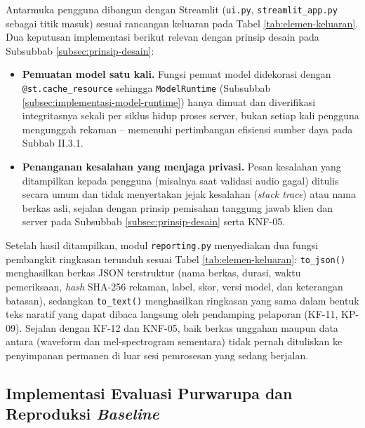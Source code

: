    

Antarmuka pengguna dibangun dengan Streamlit (\texttt{ui.py},
\texttt{streamlit\_app.py} sebagai titik masuk) sesuai rancangan keluaran pada
Tabel \ref{tab:elemen-keluaran}. Dua keputusan implementasi berikut relevan
dengan prinsip desain pada Subsubbab \ref{subsec:prinsip-desain}:

\begin{itemize}
  \item \textbf{Pemuatan model satu kali.} Fungsi pemuat model didekorasi dengan
  \texttt{@st.cache\_resource} sehingga \texttt{ModelRuntime} (Subsubbab
  \ref{subsec:implementasi-model-runtime}) hanya dimuat dan diverifikasi
  integritasnya sekali per siklus hidup proses server, bukan setiap kali
  pengguna mengunggah rekaman -- memenuhi pertimbangan efisiensi sumber daya
  pada Subbab II.3.1.
  \item \textbf{Penanganan kesalahan yang menjaga privasi.} Pesan kesalahan yang
  ditampilkan kepada pengguna (misalnya saat validasi audio gagal) ditulis
  secara umum dan tidak menyertakan jejak kesalahan (\textit{stack trace}) atau
  nama berkas asli, sejalan dengan prinsip pemisahan tanggung jawab klien dan
  server pada Subsubbab \ref{subsec:prinsip-desain} serta KNF-05.
\end{itemize}

Setelah hasil ditampilkan, modul \texttt{reporting.py} menyediakan dua fungsi
pembangkit ringkasan terunduh sesuai Tabel \ref{tab:elemen-keluaran}:
\texttt{to\_json()} menghasilkan berkas JSON terstruktur (nama berkas, durasi,
waktu pemeriksaan, \textit{hash} SHA-256 rekaman, label, skor, versi model, dan
keterangan batasan), sedangkan \texttt{to\_text()} menghasilkan ringkasan yang
sama dalam bentuk teks naratif yang dapat dibaca langsung oleh pendamping
pelaporan (KF-11, KP-09). Sejalan dengan KF-12 dan KNF-05, baik berkas unggahan
maupun data antara (waveform dan mel-spectrogram sementara) tidak pernah
dituliskan ke penyimpanan permanen di luar sesi pemrosesan yang sedang
berjalan.

\subsection{Implementasi Evaluasi Purwarupa dan Reproduksi \textit{Baseline}}
\label{subsec:implementasi-evaluasi-app}

